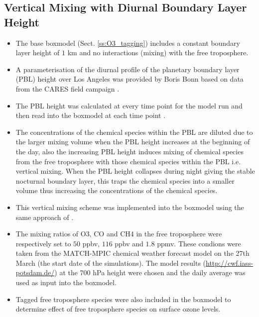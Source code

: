 \subsection{Vertical Mixing with Diurnal Boundary Layer Height} \label{ss:vertical_mixing}
\begin{itemize}
    \item The base boxmodel (Sect. \ref{ss:O3_tagging}) includes a constant boundary layer height of $1$ km and no interactions (mixing) with the free troposphere.
    \item A parameterisation of the diurnal profile of the planetary boundary layer (PBL) height over Los Angeles was provided by Boris Bonn based on data from the CARES field campaign \citep{CARES:2008} .
    \item The PBL height was calculated at every time point for the model run and then read into the boxmodel at each time point .
    \item The concentrations of the chemical species within the PBL are diluted due to the larger mixing volume when the PBL height increases at the beginning of the day, also the increasing PBL height induces mixing of chemical species from the free troposphere with those chemical species within the PBL i.e. vertical mixing. When the PBL height collapses during night giving the stable nocturnal boundary layer, this traps the chemical species into a smaller volume thus increasing the concentrations of the chemical species.
    \item This vertical mixing scheme was implemented into the boxmodel using the same approach of \citet{Lourens:2012}.
    \item The mixing ratios of O3, CO and CH4 in the free troposphere were respectively set to $50$ ppbv, $116$ ppbv and $1.8$ ppmv. These condions were taken from the MATCH-MPIC chemical weather forecast model on the 27th March (the start date of the simulations). The model results (\url{http://cwf.iass-potsdam.de/}) at the 700 hPa height were chosen and the daily average was used as input into the boxmodel. 
    \item Tagged free troposphere species were also included in the boxmodel to determine effect of free troposphere species on surface ozone levels.
\end{itemize}

